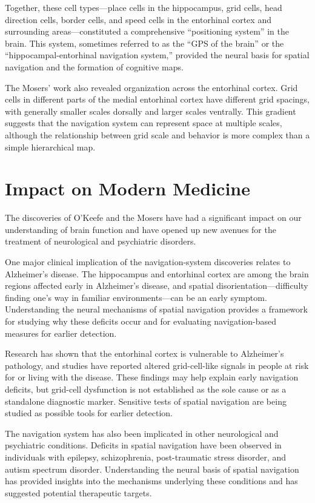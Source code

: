 Together, these cell types---place cells in the hippocampus, grid cells, head direction cells, border cells, and speed cells in the entorhinal cortex and surrounding areas---constituted a comprehensive ``positioning system'' in the brain. This system, sometimes referred to as the ``GPS of the brain'' or the ``hippocampal-entorhinal navigation system,'' provided the neural basis for spatial navigation and the formation of cognitive maps.

The Mosers' work also revealed organization across the entorhinal cortex. Grid cells in different parts of the medial entorhinal cortex have different grid spacings, with generally smaller scales dorsally and larger scales ventrally. This gradient suggests that the navigation system can represent space at multiple scales, although the relationship between grid scale and behavior is more complex than a simple hierarchical map.

\section{Impact on Modern Medicine}

The discoveries of O'Keefe and the Mosers have had a significant impact on our understanding of brain function and have opened up new avenues for the treatment of neurological and psychiatric disorders.

One major clinical implication of the navigation-system discoveries relates to Alzheimer's disease. The hippocampus and entorhinal cortex are among the brain regions affected early in Alzheimer's disease, and spatial disorientation---difficulty finding one's way in familiar environments---can be an early symptom. Understanding the neural mechanisms of spatial navigation provides a framework for studying why these deficits occur and for evaluating navigation-based measures for earlier detection.

Research has shown that the entorhinal cortex is vulnerable to Alzheimer's pathology, and studies have reported altered grid-cell-like signals in people at risk for or living with the disease. These findings may help explain early navigation deficits, but grid-cell dysfunction is not established as the sole cause or as a standalone diagnostic marker. Sensitive tests of spatial navigation are being studied as possible tools for earlier detection.

The navigation system has also been implicated in other neurological and psychiatric conditions. Deficits in spatial navigation have been observed in individuals with epilepsy, schizophrenia, post-traumatic stress disorder, and autism spectrum disorder. Understanding the neural basis of spatial navigation has provided insights into the mechanisms underlying these conditions and has suggested potential therapeutic targets.

